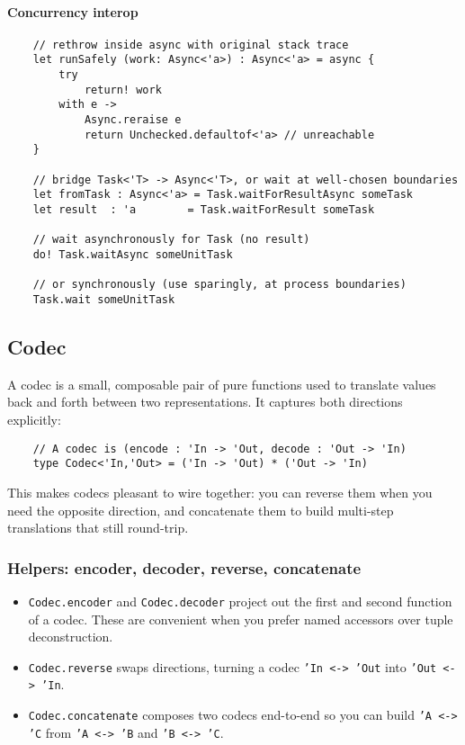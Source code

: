 \documentclass{article}
\begin{document}
\paragraph{Concurrency interop}
\begin{verbatim}
    // rethrow inside async with original stack trace
    let runSafely (work: Async<'a>) : Async<'a> = async {
        try
            return! work
        with e ->
            Async.reraise e
            return Unchecked.defaultof<'a> // unreachable
    }

    // bridge Task<'T> -> Async<'T>, or wait at well-chosen boundaries
    let fromTask : Async<'a> = Task.waitForResultAsync someTask
    let result  : 'a        = Task.waitForResult someTask

    // wait asynchronously for Task (no result)
    do! Task.waitAsync someUnitTask

    // or synchronously (use sparingly, at process boundaries)
    Task.wait someUnitTask
\end{verbatim}

\subsection{Codec}

\noindent A codec is a small, composable pair of pure functions used to translate values back and forth between two representations. It captures both directions explicitly:
\begin{verbatim}
    // A codec is (encode : 'In -> 'Out, decode : 'Out -> 'In)
    type Codec<'In,'Out> = ('In -> 'Out) * ('Out -> 'In)
\end{verbatim}
This makes codecs pleasant to wire together: you can reverse them when you need the opposite direction, and concatenate them to build multi-step translations that still round-trip.

\subsubsection{Helpers: encoder, decoder, reverse, concatenate}
\begin{itemize}
  \item \texttt{Codec.encoder} and \texttt{Codec.decoder} project out the first and second function of a codec. These are convenient when you prefer named accessors over tuple deconstruction.
  \item \texttt{Codec.reverse} swaps directions, turning a codec \texttt{'In <-> 'Out} into \texttt{'Out <-> 'In}.
  \item \texttt{Codec.concatenate} composes two codecs end-to-end so you can build \texttt{'A <-> 'C} from \texttt{'A <-> 'B} and \texttt{'B <-> 'C}.
\end{itemize}
\end{document}
